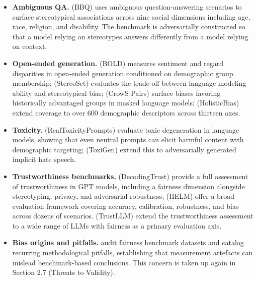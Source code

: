 \documentclass[10pt]{article}
\begin{document}
\begin{itemize}
\item \textbf{Ambiguous QA.} \cite{parrish2022bbq} (BBQ) uses ambiguous question-answering scenarios to surface stereotypical associations across nine social dimensions including age, race, religion, and disability. The benchmark is adversarially constructed so that a model relying on stereotypes answers differently from a model relying on context.
\end{itemize}

\begin{itemize}
\item \textbf{Open-ended generation.} \cite{dhamala2021bold} (BOLD) measures sentiment and regard disparities in open-ended generation conditioned on demographic group membership; \cite{nadeem2021stereoset} (StereoSet) evaluates the trade-off between language modeling ability and stereotypical bias; \cite{nangia2020crows} (CrowS-Pairs) surface biases favoring historically advantaged groups in masked language models; \cite{smith2022sorry} (HolisticBias) extend coverage to over 600 demographic descriptors across thirteen axes.
\end{itemize}

\begin{itemize}
\item \textbf{Toxicity.} \cite{gehman2020realtoxicityprompts} (RealToxicityPrompts) evaluate toxic degeneration in language models, showing that even neutral prompts can elicit harmful content with demographic targeting; \cite{hartvigsen2022toxigen} (ToxiGen) extend this to adversarially generated implicit hate speech.
\end{itemize}

\begin{itemize}
\item \textbf{Trustworthiness benchmarks.} \cite{wang2023decodingtrust} (DecodingTrust) provide a full assessment of trustworthiness in GPT models, including a fairness dimension alongside stereotyping, privacy, and adversarial robustness; \cite{liang2023holistic} (HELM) offer a broad evaluation framework covering accuracy, calibration, robustness, and bias across dozens of scenarios. \cite{huang2024trustllm} (TrustLLM) extend the trustworthiness assessment to a wide range of LLMs with fairness as a primary evaluation axis.
\end{itemize}

\begin{itemize}
\item \textbf{Bias origins and pitfalls.} \cite{blodgett2021stereotyping} audit fairness benchmark datasets and catalog recurring methodological pitfalls, establishing that measurement artefacts can mislead benchmark-based conclusions. This concern is taken up again in Section 2.7 (Threats to Validity).
\end{itemize}
\end{document}
